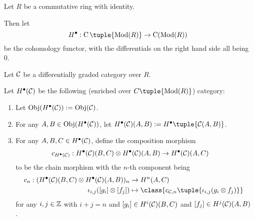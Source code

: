 \begin{notation}
    Let \( R \) be a commutative ring with identity.

    Then let
    \[
        H^\bullet: \C\tuple{\Mod(R)} \to \C(\Mod(R))
    \]
    be the cohomology functor, with the differentials on the right hand side all being \( 0 \).
\end{notation}

\begin{definition}
    \label{def:H_bullet_dg_category}
    Let \( {\mathcal{C}} \) be a differentially graded category over  \( R \).

    Let \( H^\bullet({\mathcal{C}}) \) be the following (enriched over \( C\tuple{\Mod(R)} \)) category:
    \begin{enumerate}
        \item Let \( \operatorname{Obj}(H^\bullet({\mathcal{C}})) := \operatorname{Obj}({\mathcal{C}}) \).
        \item For any \( A, B \in \operatorname{Obj}(H^\bullet({\mathcal{C}})) \), let \( H^\bullet(\Cc)(A, B) := H^\bullet \tuple{\Cc(A, B)} \).
        \item {
            For any \( A, B, C \in H^\bullet({\mathcal{C}}) \), define the composition morphism
            \begin{align*}
                c_{H^\bullet({\mathcal{C}})}: H^\bullet({\mathcal{C}})(B, C) \otimes H^\bullet({\mathcal{C}})(A, B) &\to H^\bullet({\mathcal{C}})(A, C)
            \end{align*}
            to be the chain morphism with the \( n \)-th component being
            \begin{align*}
                c_n: (H^\bullet(\Cc)(B, C) \otimes H^\bullet(\Cc)(A, B))_n &\to H^n(A, C) \\
                \iota_{i, j}([g_i] \otimes [f_j]) &\mapsto \class{c_{\Cc,n}\tuple{\iota_{i, j}(g_i \otimes f_j)}}
            \end{align*}
            for any \( i, j \in {\mathbb{Z}} \) with \( i + j = n \) and \( [g_i] \in H^i({\mathcal{C}})(B, C) \) and \( [f_j] \in H^j({\mathcal{C}})(A, B) \).
        }
    \end{enumerate}
\end{definition}
